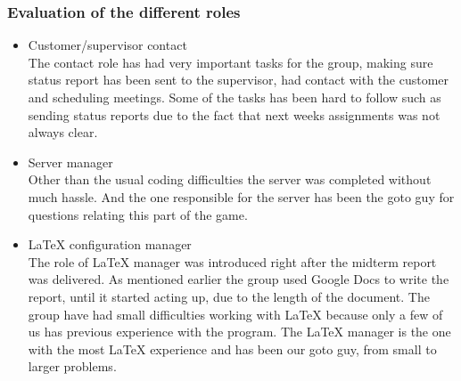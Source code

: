 \subsubsection{Evaluation of the different roles}
\begin{itemize} \setlength{\itemsep}{0cm}\setlength{\parskip}{0cm}
	\item Customer/supervisor contact \\
	The contact role has had very important tasks for the group, making sure status report has been sent to the supervisor,  had contact with the customer and scheduling meetings. Some of the tasks has been hard to follow such as sending status reports due to the fact that next weeks assignments was not always clear. 
	\item Server manager\\
Other than the usual coding difficulties the server was completed without much hassle. And the one responsible for the server has been the goto guy for questions relating this part of the game.
	\item LaTeX configuration manager\\
The role of LaTeX manager was introduced right after the midterm report was delivered. As mentioned earlier the group used Google Docs to write the report, until it started acting up, due to the length of the document. The group have had small difficulties working with LaTeX because only a few of us has previous experience with the program. The LaTeX manager is the one with the most LaTeX experience and has been our goto guy, from small to larger problems.


\end{itemize}
